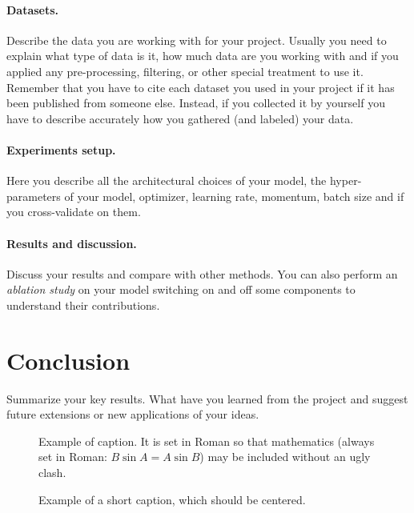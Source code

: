 \documentclass[10pt,twocolumn,letterpaper]{article}
\begin{document}
\paragraph{Datasets.}
Describe the data you are working with for your project. Usually you need to explain what type of data is it, how much data are you working with and if you applied any pre-processing, filtering, or other special treatment to use it. Remember that you have to cite each dataset you used in your project if it has been published from someone else. Instead, if you collected it by yourself you have to describe accurately how you gathered (and labeled) your data. 

\paragraph{Experiments setup.}
Here you describe all the architectural choices of your model, the hyper-parameters of your model, \eg optimizer, learning rate, momentum, batch size and if you cross-validate on them. 

\paragraph{Results and discussion.}
Discuss your results and compare with other methods. You can also perform an \emph{ablation study} on your model switching on and off some components to understand their contributions.

\section{Conclusion} 
Summarize your key results. What have you learned from the project and suggest future extensions or new applications of your ideas.


\begin{figure}[t]
\begin{center}
\fbox{\rule{0pt}{2in} \rule{0.9\linewidth}{0pt}}
\end{center}
   \caption{Example of caption.  It is set in Roman so that mathematics
   (always set in Roman: $B \sin A = A \sin B$) may be included without an
   ugly clash.}
\label{fig:long}
\label{fig:onecol}
\end{figure}


\begin{figure*}
\begin{center}
\fbox{\rule{0pt}{2in} \rule{.9\linewidth}{0pt}}
\end{center}
   \caption{Example of a short caption, which should be centered.}
\label{fig:short}
\end{figure*}
\end{document}
